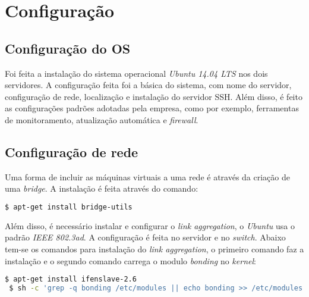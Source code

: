 
\chapter{Configuração}
\label{cap:apconfiguracao}

\section{Configuração do \ac{OS}}
\label{ap:confos}

Foi feita a instalação do sistema operacional \textit{Ubuntu 14.04 \ac{LTS}} nos dois servidores. A configuração feita foi a básica do sistema,
com nome do servidor, configuração de rede, localização e instalação do servidor \ac{SSH}.
Além disso, é feito as configurações padrões adotadas pela empresa, como por exemplo, ferramentas de monitoramento, atualização automática
e \textit{firewall}.

\section{Configuração de rede}
\label{ap:confrede}

Uma forma de incluir as máquinas virtuais a uma rede é através da criação de uma \textit{bridge}. A instalação é feita através do comando:
\begin{lstlisting}[language=bash]
  $ apt-get install bridge-utils
\end{lstlisting}

Além disso, é necessário instalar e configurar o \textit{link aggregation}, o \textit{Ubuntu} usa o padrão \textit{IEEE 802.3ad}. A configuração 
é feita no servidor e no \textit{switch}. Abaixo tem-se os comandos para instalação do \textit{link aggregation}, o primeiro comando faz a 
instalação e o segundo comando carrega o modulo \textit{bonding} no \textit{kernel}:
\begin{lstlisting}[language=bash]
 $ apt-get install ifenslave-2.6
 $ sh -c 'grep -q bonding /etc/modules || echo bonding >> /etc/modules'
\end{lstlisting}

